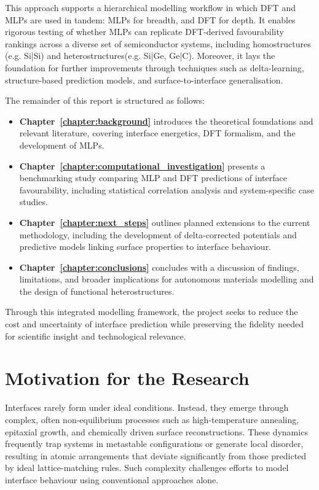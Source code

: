 This approach supports a hierarchical modelling workflow in which DFT and MLPs are used in tandem: MLPs for breadth,
and DFT for depth. It enables rigorous testing of whether MLPs can replicate DFT-derived favourability rankings across
a diverse set of semiconductor systems, including homostructures (e.g. Si|Si) and heterostructures(e.g. Si|Ge, Ge|C).
Moreover, it lays the foundation for further improvements through techniques such as delta-learning, structure-based
prediction models, and surface-to-interface generalisation.

The remainder of this report is structured as follows:

\begin{itemize}
    \item \textbf{Chapter~\ref{chapter:background}} introduces the theoretical foundations and relevant literature,
    covering interface energetics, DFT formalism, and the development of MLPs.
    \item \textbf{Chapter~\ref{chapter:computational_investigation}} presents a benchmarking study comparing MLP and
    DFT predictions of interface favourability, including statistical correlation analysis and system-specific case
    studies.
    \item \textbf{Chapter~\ref{chapter:next_steps}} outlines planned extensions to the current methodology, including
    the development of delta-corrected potentials and predictive models linking surface properties to interface
    behaviour.
    \item \textbf{Chapter~\ref{chapter:conclusions}} concludes with a discussion of findings, limitations, and broader
    implications for autonomous materials modelling and the design of functional heterostructures.
\end{itemize}

Through this integrated modelling framework, the project seeks to reduce the cost and uncertainty of interface
prediction while preserving the fidelity needed for scientific insight and technological relevance.

\section{Motivation for the Research}
\label{section:motivation}

Interfaces rarely form under ideal conditions. Instead, they emerge through complex, often non-equilibrium processes
such as high-temperature annealing, epitaxial growth, and chemically driven surface reconstructions. These dynamics
frequently trap systems in metastable configurations or generate local disorder, resulting in atomic arrangements that
deviate significantly from those predicted by ideal lattice-matching rules. Such complexity challenges efforts to model
interface behaviour using conventional approaches alone.

